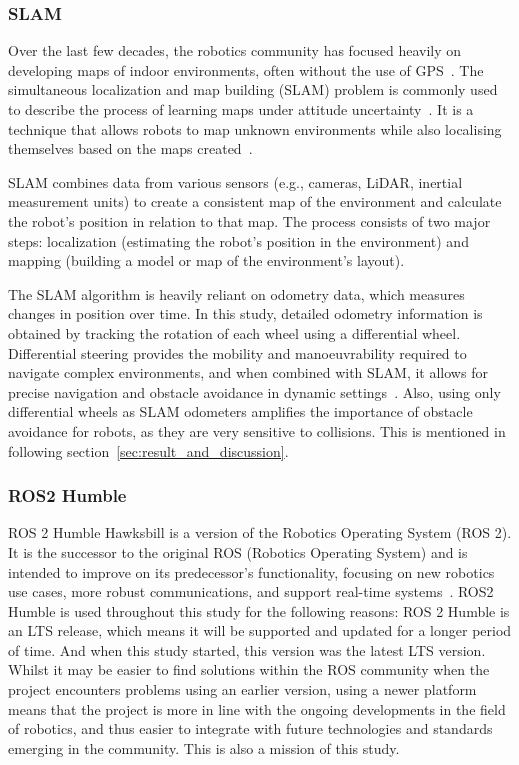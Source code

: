 \subsubsection{SLAM}
\label{subsec:slam}
Over the last few decades, the robotics community has focused heavily on developing maps of indoor environments, often without the use of GPS~\cite{slam}. 
The simultaneous localization and map building (SLAM) problem is commonly used to describe the process of learning maps under attitude uncertainty~\cite{slamoverview}. 
It is a technique that allows robots to map unknown environments while also localising themselves based on the maps created~\cite{slamii}.

SLAM combines data from various sensors 
(e.g., cameras, LiDAR, inertial measurement units) to create a consistent map of the environment and calculate the robot's position in relation to that map. 
The process consists of two major steps: localization (estimating the robot's position in the environment) and mapping (building a model or map of the environment's layout).

The SLAM algorithm is heavily reliant on odometry data, which measures changes in position over time. 
In this study, detailed odometry information is obtained by tracking the rotation of each wheel using a differential wheel. 
Differential steering provides the mobility and manoeuvrability required to navigate complex environments, 
and when combined with SLAM, it allows for precise navigation and obstacle avoidance in dynamic settings~\cite{slamtutorial}. 
Also, using only differential wheels as SLAM odometers amplifies the importance of obstacle avoidance for robots, 
as they are very sensitive to collisions. This is mentioned in following section~\ref{sec:result_and_discussion}.

\subsubsection{ROS2 Humble}
ROS 2 Humble Hawksbill is a version of the Robotics Operating System (ROS 2).
It is the successor to the original ROS (Robotics Operating System) and is intended to improve on its predecessor's functionality,
focusing on new robotics use cases, more robust communications, and support real-time systems~\cite{ros2}.
ROS2 Humble is used throughout this study for the following reasons: ROS 2 Humble is an LTS release, 
which means it will be supported and updated for a longer period of time. 
And when this study started, this version was the latest LTS version. 
Whilst it may be easier to find solutions within the ROS community when the project encounters problems using an earlier version, 
using a newer platform means that the project is more in line with the ongoing developments in the field of robotics, 
and thus easier to integrate with future technologies and standards emerging in the community. This is also a mission of this study.

